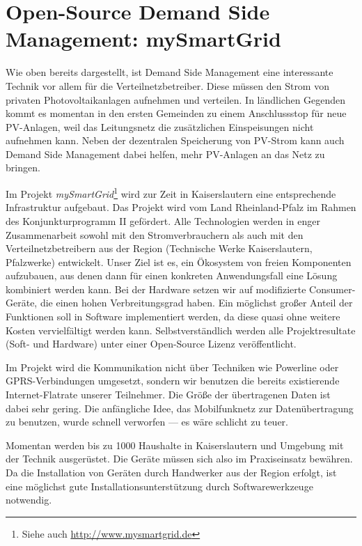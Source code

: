 \documentclass[logo]{fhgart}
\begin{document}
\section{Open-Source Demand Side Management: mySmartGrid}\label{sec:chancen_open-source}

Wie oben bereits dargestellt, ist Demand Side Management eine
interessante Technik vor allem für die Verteilnetzbetreiber. Diese
müssen den Strom von privaten Photovoltaikanlagen aufnehmen und
verteilen. In ländlichen Gegenden kommt es momentan in den ersten Gemeinden zu
einem Anschlussstop für neue PV-Anlagen, weil das Leitungsnetz die
zusätzlichen Einspeisungen nicht aufnehmen kann. Neben der dezentralen
Speicherung von PV-Strom kann auch Demand Side Management dabei helfen,
mehr PV-Anlagen an das Netz zu bringen.

Im Projekt \emph{mySmartGrid}\footnote{Siehe auch
\url{http://www.mysmartgrid.de}} wird zur Zeit in Kaiserslautern eine
entsprechende Infrastruktur aufgebaut. Das Projekt wird vom Land
Rheinland-Pfalz im Rahmen des Konjunkturprogramm II gefördert. Alle
Technologien werden in enger Zusammenarbeit sowohl mit den
Stromverbrauchern als auch mit den Verteilnetzbetreibern aus der Region
(Technische Werke Kaiserslautern, Pfalzwerke) entwickelt.  Unser Ziel
ist es, ein Ökosystem von freien Komponenten aufzubauen, aus denen dann
für einen konkreten Anwendungsfall eine Lösung kombiniert werden kann.
Bei der Hardware setzen wir auf modifizierte
Consumer-Geräte, die einen hohen Verbreitungsgrad haben.  Ein möglichst
großer Anteil der Funktionen soll in Software implementiert werden, da
diese quasi ohne weitere Kosten vervielfältigt werden kann.
Selbstverständlich werden alle Projektresultate (Soft- und Hardware)
unter einer Open-Source Lizenz veröffentlicht. 

Im Projekt wird die Kommunikation nicht über Techniken wie Powerline
oder GPRS-Verbindungen umgesetzt, sondern wir benutzen die bereits
existierende Internet-Flatrate unserer Teilnehmer. Die Größe der
übertragenen Daten ist dabei sehr gering. Die anfängliche Idee,
das Mobilfunknetz zur Datenübertragung zu benutzen, wurde schnell
verworfen --- es wäre schlicht zu teuer.

Momentan werden bis zu 1000 Haushalte in Kaiserslautern und Umgebung
mit der Technik ausgerüstet. Die Geräte müssen sich also im
Praxiseinsatz bewähren. Da die Installation von Geräten durch
Handwerker aus der Region erfolgt, ist eine möglichst gute
Installationsunterstützung durch Softwarewerkzeuge notwendig. 
\end{document}
